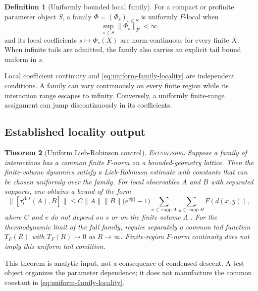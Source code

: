 \documentclass[12pt]{article}
\newtheorem{theorem}{Theorem}[section]
\theoremstyle{definition}
\newtheorem{definition}[theorem]{Definition}
\theoremstyle{remark}
\newcommand{\EST}{\textnormal{\textsc{Established}}}
\begin{document}
\begin{definition}[Uniformly bounded local family]
For a compact or profinite parameter object $S$, a family
$\Phi=(\Phi_s)_{s\in S}$ is uniformly $F$-local when
\begin{equation}
\sup_{s\in S}\|\Phi_s\|_F<\infty
\label{eq:uniform-family-locality}
\end{equation}
and its local coefficients $s\mapsto\Phi_s(X)$ are norm-continuous for every
finite $X$.  When infinite tails are admitted, the family also carries an
explicit tail bound uniform in $s$.
\end{definition}

Local coefficient continuity and \cref{eq:uniform-family-locality} are
independent conditions.  A family can vary continuously on every finite
region while its interaction range escapes to infinity.  Conversely, a
uniformly finite-range assignment can jump discontinuously in its
coefficients.

\subsection{Established locality output}

\begin{theorem}[Uniform Lieb-Robinson control]
\label{thm:uniform-lr}
\EST{}  Suppose a family of interactions has a common finite $F$-norm on a
bounded-geometry lattice.  Then the
finite-volume dynamics satisfy a Lieb-Robinson estimate with constants that
can be chosen uniformly over the family.  For local observables $A$ and $B$
with separated supports, one obtains a bound of the form
\begin{equation}
\|[\tau^{\Lambda,s}_t(A),B]\|
\le
C\|A\|\|B\|
\bigl(e^{v|t|}-1\bigr)
\sum_{x\in\operatorname{supp}A}
\sum_{y\in\operatorname{supp}B}F(d(x,y)),
\label{eq:lr-bound}
\end{equation}
where $C$ and $v$ do not depend on $s$ or on the finite volume $\Lambda$
\cite{LiebRobinson1972,NachtergaeleSims2010}.  For the thermodynamic limit of
the full family, require separately a common tail function $T_F(R)$ with
$T_F(R)\to0$ as $R\to\infty$.  Finite-region $F$-norm continuity does not
imply this uniform tail condition.
\end{theorem}

This theorem is analytic input, not a consequence of condensed descent.  A
test object organizes the parameter dependence; it does not manufacture the
common constant in \cref{eq:uniform-family-locality}.
\end{document}
